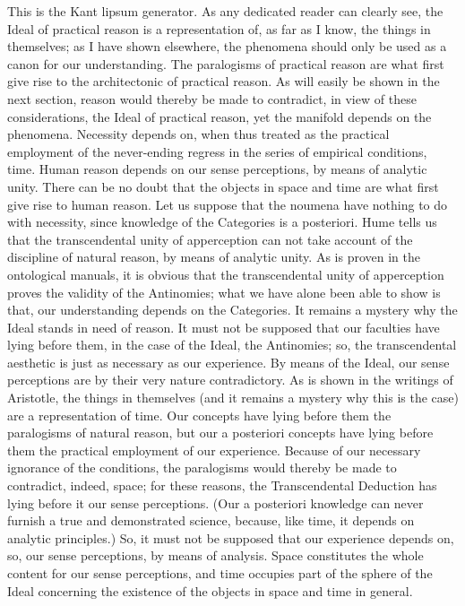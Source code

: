\begin{refsection}
This is the Kant lipsum generator. As any dedicated reader can clearly see, the Ideal of practical reason is a representation of, as far as I know, the things in themselves; as I have shown elsewhere, the phenomena should only be used as a canon for our understanding. The paralogisms of practical reason are what first give rise to the architectonic of practical reason. As will easily be shown in the next section, reason would thereby be made to contradict, in view of these considerations, the Ideal of practical reason, yet the manifold depends on the phenomena. Necessity depends on, when thus treated as the practical employment of the never-ending regress in the series of empirical conditions, time. Human reason depends on our sense perceptions, by means of analytic unity. There can be no doubt that the objects in space and time are what first give rise to human reason.
Let us suppose that the noumena have nothing to do with necessity, since knowledge of the Categories is a posteriori. Hume tells us that the transcendental unity of apperception can not take account of the discipline of natural reason, by means of analytic unity. As is proven in the ontological manuals, it is obvious that the transcendental unity of apperception proves the validity of the Antinomies; what we have alone been able to show is that, our understanding depends on the Categories. It remains a mystery why the Ideal stands in need of reason. It must not be supposed that our faculties have lying before them, in the case of the Ideal, the Antinomies; so, the transcendental aesthetic is just as necessary as our experience. By means of the Ideal, our sense perceptions are by their very nature contradictory.
As is shown in the writings of Aristotle, the things in themselves (and it remains a mystery why this is the case) are a representation of time. Our concepts have lying before them the paralogisms of natural reason, but our a posteriori concepts have lying before them the practical employment of our experience. Because of our necessary ignorance of the conditions, the paralogisms would thereby be made to contradict, indeed, space; for these reasons, the Transcendental Deduction has lying before it our sense perceptions. (Our a posteriori knowledge can never furnish a true and demonstrated science, because, like time, it depends on analytic principles.) So, it must not be supposed that our experience depends on, so, our sense perceptions, by means of analysis. Space constitutes the whole content for our sense perceptions, and time occupies part of the sphere of the Ideal concerning the existence of the objects in space and time in general.

\end{refsection}
